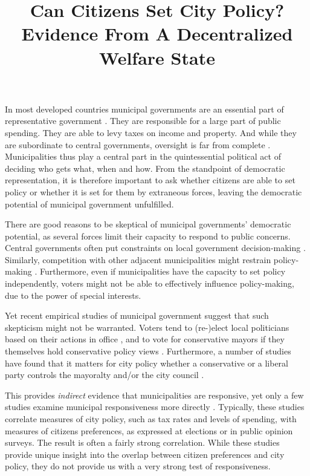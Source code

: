 \documentclass[a4paper,12pt]{article}
\title{\bigskip \bigskip \sffamily \LARGE{Can Citizens Set City Policy?} \\ \Large{ Evidence From A Decentralized Welfare State}}
\begin{document}
\noindent In most developed countries municipal governments are an essential part of representative government \citep{trounstine2009all,kersting2013reforming}. They are responsible for a large part of public spending.  They are able to levy taxes on income and property. And while they are subordinate to central governments, oversight is far from complete \citep{oecd2016subnational}. Municipalities thus play a central part in the quintessential political act of deciding who gets what, when and how. From the standpoint of democratic representation, it is therefore important to ask whether citizens are able to set policy or whether it is set for them by extraneous forces, leaving the democratic potential of municipal government unfulfilled.


There are good reasons to be skeptical of municipal governments' democratic potential, as several forces limit their capacity to respond to public concerns. Central governments often put constraints on local government decision-making \citep{peterson1981city}. Similarly, competition with other adjacent municipalities might restrain policy-making \citep{salmon2006horizontal}. Furthermore, even if municipalities have the capacity to set policy independently, voters might not be able to effectively influence policy-making, due to the power of special interests. 


Yet recent empirical studies of municipal government suggest that such skepticism might not be warranted. Voters tend to (re-)elect local politicians based on their actions in office \citep[e.g.,][]{boyne2009democracy,larsen2018relationship}, and to vote for conservative  mayors if they themselves hold conservative policy views  \citep{sances2017ideology,boudreau2015lost,hopkins2017retrospective}. Furthermore, a number of studies have found that it matters for city policy whether a conservative or a liberal party controls the mayoralty and/or the city council \citep[e.g.,][]{fiva2018power,blom2006parties,de2016mayoral}.  

This provides \textit{indirect} evidence that municipalities are responsive, yet only a few studies examine municipal responsiveness more directly \citep{tausanovitch2014representation,hajnal2010or,palus2010responsiveness,einstein2016pushing}. Typically, these studies correlate measures of city policy, such as tax rates and levels of spending, with measures of citizens preferences, as expressed at elections or in public opinion surveys. The result is often a fairly strong correlation. While these studies provide unique insight into the overlap between citizen preferences and city policy, they do not provide us with a very strong test of responsiveness. 
\end{document}
